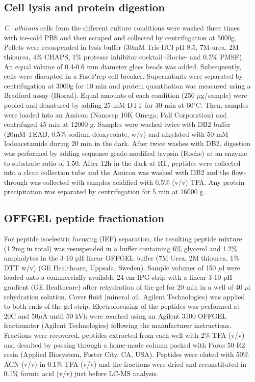 \subsection*{Cell lysis and protein digestion}

\textit{\mbox{C. albicans}} cells from the different culture conditions were washed three times with ice-cold
PBS and then scraped and collected by centrifugation at 5000g. Pellets were resuspended in
lysis buffer (30mM Tris-HCl pH 8.5, 7M urea, 2M thiourea, 4\% CHAPS, 1\% protease inhibitor
cocktail -Roche- and 0.5\% PMSF). An equal volume of 0.4-0.6 mm diameter glass beads
was added. Subsequently, cells were disrupted in a FastPrep cell breaker. Supernatants
were separated by centrifugation at 3000g for 10 min and protein quantitation was measured
using a Bradford assay (Biorad).
Equal amounts of each condition (250 $\mu$g/sample) were pooled and denatured by adding 25
mM DTT for 30 min at 60$^{\circ}$C. Then, samples were loaded into an Amicon (Nanosep 10K
Omega; Pall Corporation) and centrifuged 45 min at 12000 g. Samples were washed twice
with DB2 buffer (20mM TEAB, 0,5\% sodium deoxycolate, w/v) and alkylated with 50 mM
Iodoacetamide during 20 min in the dark. After twice washes with DB2, digestion was
performed by adding sequence grade-modified trypsin (Roche) at an enzyme to substrate
ratio of 1:50. After 12h in the dark at RT, peptides were collected into a clean collection tube
and the Amicon was washed with DB2 and the flow-through was collected with samples
acidified with 0.5\% (v/v) TFA. Any protein precipitation was separated by centrifugation for 5
min at 16000 g.


\subsection*{OFFGEL peptide fractionation}

For peptide isoelectric focusing (IEF) separation, the resulting peptide mixture (1.2mg in
total) was resuspended in a buffer containing 6\% glycerol and 1.2\% ampholytes in the 3-10
pH linear OFFGEL buffer (7M Urea, 2M thiourea, 1\% DTT w/v) (GE Healthcare, Uppsala,
Sweden). Sample volumes of 150  $\mu$l were loaded onto a commercially available 24-cm IPG
strip with a linear 3-10 pH gradient (GE Healthcare) after rehydration of the gel for 20 min in
a well of 40 $\mu$l rehydration solution. Cover fluid (mineral oil, Agilent Technologies) was applied
to both ends of the gel strip. Electrofocusing of the peptides was performed at 20C and 50$\mu$A 
until 50 kVh were reached using an Agilent 3100 OFFGEL fractionator (Agilent
Technologies) following the manufacturer instructions. Fractions were recovered, peptides
extracted from each well with 2\% TFA (v/v) and desalted by passing through a home-made
column packed with Poros 50 R2 resin (Applied Biosystem, Foster City, CA, USA). Peptides
were eluted with 50\% ACN (v/v) in 0.1\% TFA (v/v) and the fractions were dried and reconstituted in
0.1\% formic acid (v/v) just before LC-MS analysis.


